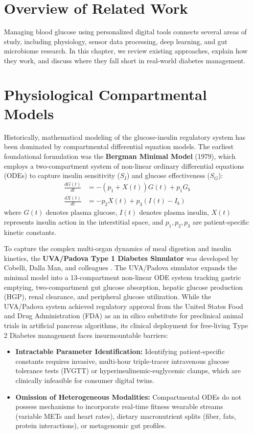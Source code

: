 \label{chap:literature_review}

\section{Overview of Related Work}
Managing blood glucose using personalized digital tools connects several areas of study, including physiology, sensor data processing, deep learning, and gut microbiome research. In this chapter, we review existing approaches, explain how they work, and discuss where they fall short in real-world diabetes management.

\section{Physiological Compartmental Models}
Historically, mathematical modeling of the glucose-insulin regulatory system has been dominated by compartmental differential equation models. The earliest foundational formulation was the \textbf{Bergman Minimal Model} (1979), which employs a two-compartment system of non-linear ordinary differential equations (ODEs) to capture insulin sensitivity ($S_I$) and glucose effectiveness ($S_G$):
\begin{align}
    \frac{dG(t)}{dt} &= -(p_1 + X(t))G(t) + p_1 G_b \\
    \frac{dX(t)}{dt} &= -p_2 X(t) + p_3 (I(t) - I_b)
\end{align}
where $G(t)$ denotes plasma glucose, $I(t)$ denotes plasma insulin, $X(t)$ represents insulin action in the interstitial space, and $p_1, p_2, p_3$ are patient-specific kinetic constants.

To capture the complex multi-organ dynamics of meal digestion and insulin kinetics, the \textbf{UVA/Padova Type 1 Diabetes Simulator} was developed by Cobelli, Dalla Man, and colleagues \cite{cobelli2011uva}. The UVA/Padova simulator expands the minimal model into a 13-compartment non-linear ODE system tracking gastric emptying, two-compartment gut glucose absorption, hepatic glucose production (HGP), renal clearance, and peripheral glucose utilization. While the UVA/Padova system achieved regulatory approval from the United States Food and Drug Administration (FDA) as an in silico substitute for preclinical animal trials in artificial pancreas algorithms, its clinical deployment for free-living Type 2 Diabetes management faces insurmountable barriers:
\begin{itemize}
    \item \textbf{Intractable Parameter Identification:} Identifying patient-specific constants requires invasive, multi-hour triple-tracer intravenous glucose tolerance tests (IVGTT) or hyperinsulinemic-euglycemic clamps, which are clinically infeasible for consumer digital twins.
    \item \textbf{Omission of Heterogeneous Modalities:} Compartmental ODEs do not possess mechanisms to incorporate real-time fitness wearable streams (variable METs and heart rates), dietary macronutrient splits (fiber, fats, protein interactions), or metagenomic gut profiles.
\end{itemize}

